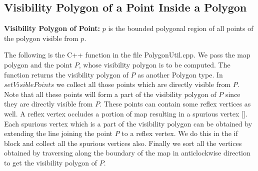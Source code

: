 \newcommand{\jttstylea}{\color[rgb]{1.00,1.00,1.00}} %
\newcommand{\jttstyleb}{\color[rgb]{.501,.501,.501}} %
\newcommand{\jttstylec}{\color[rgb]{.247,.498,.372}} %
\newcommand{\jttstyled}{\color[rgb]{.247,.498,.372}} %
\newcommand{\jttstylee}{\color[rgb]{.498,.000,.333}} %
\newcommand{\jttstylef}{\color[rgb]{.164,.000,1.00}} %
\newcommand{\jttstyleg}{\color[rgb]{.600,.000,.000}} %
\newcommand{\jttstyleh}{\color[rgb]{.600,.000,.000}} %
\newcommand{\jttstylei}{\color[rgb]{.000,.000,.000}} %
\newcommand{\jttstylej}{\color[rgb]{.498,.000,.333}} %
\newcommand{\jttstylek}{\color[rgb]{.000,.000,.000}} %
\newcommand{\jttstylel}{\color[rgb]{.498,.623,.749}} %
\newcommand{\jttstylem}{\color[rgb]{.498,.498,.623}} %
\newcommand{\jttstylen}{\color[rgb]{.247,.247,.749}} %
\newcommand{\jttstyleo}{\color[rgb]{.247,.372,.749}} %
\newcommand{\jttstylep}{\color[rgb]{1.00,.380,.000}} %
\newcommand{\jttstyleq}{\color[rgb]{.392,.392,.392}} %


\subsection{Visibility Polygon of a Point Inside a Polygon}

\begin{definition}
 {\bf Visibility Polygon of Point:} $p$ is the bounded polygonal region of all points of the polygon visible from $p$.  
\end{definition}

The following is the C++ function in the file PolygonUtil.cpp. We pass the map polygon and the point $P$, whose visibility polygon is to be
 computed. The function returns the visibility polygon of $P$ as another Polygon type.
In $setVisiblePoints$ we collect all those points which are directly visible from $P$. Note that
 all these points will form a part of the visibility polygon of $P$ since they are directly visible from $P$. These points can contain 
 some reflex vertices as well. A reflex vertex occludes a portion of map resulting in a spurious vertex [\cite{key4}]. Each spurious vertex which is a part of the visibility polygon
 can be obtained by extending the line joining the point $P$ to a reflex vertex. We do this in the if block and collect all the 
spurious vertices also. Finally we sort all the vertices obtained by traversing along the boundary of the map in anticlockwise direction to get the visibility polygon of $P$.\\ \\

